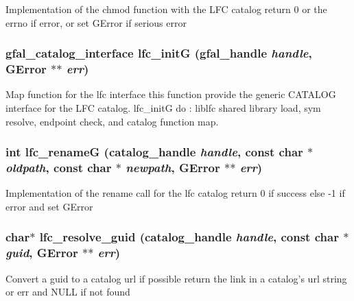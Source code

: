 Implementation of the chmod function with the LFC catalog return 0 or the errno if error, or set GError if serious error 
\subsubsection{\setlength{\rightskip}{0pt plus 5cm}gfal\_\-catalog\_\-interface lfc\_\-init\-G (gfal\_\-handle {\em handle}, GError $\ast$$\ast$ {\em err})}\label{gfal__common__lfc_8c_18fc1e787694363fd5457f9b8f020cf8}


Map function for the lfc interface this function provide the generic CATALOG interface for the LFC catalog. lfc\_\-init\-G do : liblfc shared library load, sym resolve, endpoint check, and catalog function map. 
\subsubsection{\setlength{\rightskip}{0pt plus 5cm}int lfc\_\-rename\-G (catalog\_\-handle {\em handle}, const char $\ast$ {\em oldpath}, const char $\ast$ {\em newpath}, GError $\ast$$\ast$ {\em err})}\label{gfal__common__lfc_8c_cb750f4f936abd772a5f53f5b1fbdaec}


Implementation of the rename call for the lfc catalog return 0 if success else -1 if error and set GError 
\subsubsection{\setlength{\rightskip}{0pt plus 5cm}char$\ast$ lfc\_\-resolve\_\-guid (catalog\_\-handle {\em handle}, const char $\ast$ {\em guid}, GError $\ast$$\ast$ {\em err})}\label{gfal__common__lfc_8c_b8943f8f5fd7211851bf7732d9c3b50b}


Convert a guid to a catalog url if possible return the link in a catalog's url string or err and NULL if not found 
